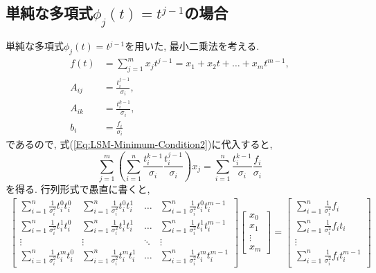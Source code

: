 \subsection{単純な多項式$\phi_{j}(t) = t^{j-1}$の場合}
単純な多項式$\phi_{j}(t) = t^{j-1}$を用いた, 最小二乗法を考える. 
\begin{align}
    f(t) &=
    \sum_{j=1}^{m} x_{j} t^{j-1} =
    x_{1} + x_{2} t + \ldots + x_{m}t^{m-1},
    \\
    A_{ij} &=
    \frac{t_{i}^{j-1}}{\sigma_{i}},
    \\
    A_{ik} &=
    \frac{t_{i}^{k-1}}{\sigma_{i}},
    \\
    b_{i} &=
    \frac{f_{i}}{\sigma_{i}}
\end{align}
であるので, 式(\ref{Eq:LSM-Minimum-Condition2})に代入すると, 
\begin{equation}
    \sum_{j=1}^{m}
    \left(
        \sum_{i=1}^{n}
        \frac{t_{i}^{k-1}}{\sigma_{i}}
        \frac{t_{i}^{j-1}}{\sigma_{i}}
    \right) x_{j}
    =
    \sum_{i=1}^{n}
    \frac{t_{i}^{k-1}}{\sigma_{i}}
    \frac{f_{i}}{\sigma_{i}}
\end{equation}
を得る. 行列形式で愚直に書くと, 
\begin{align}
    \begin{bmatrix}
        \sum_{i=1}^{n} \frac{1}{\sigma_{i}^{2}} t_{i}^{0} t_{i}^{0} &
        \sum_{i=1}^{n} \frac{1}{\sigma_{i}^{2}} t_{i}^{0} t_{i}^{1} &
        \ldots &
        \sum_{i=1}^{n} \frac{1}{\sigma_{i}^{2}} t_{i}^{0} t_{i}^{m-1}
        \\
        \sum_{i=1}^{n} \frac{1}{\sigma_{i}^{2}} t_{i}^{1} t_{i}^{0} &
        \sum_{i=1}^{n} \frac{1}{\sigma_{i}^{2}} t_{i}^{1} t_{i}^{1} &
        \ldots &
        \sum_{i=1}^{n} \frac{1}{\sigma_{i}^{2}} t_{i}^{1} t_{i}^{m-1}
        \\
        \vdots & \vdots & \ddots & \vdots
        \\
        \sum_{i=1}^{n} \frac{1}{\sigma_{i}^{2}} t_{i}^{m} t_{i}^{0} &
        \sum_{i=1}^{n} \frac{1}{\sigma_{i}^{2}} t_{i}^{m} t_{i}^{1} &
        \ldots &
        \sum_{i=1}^{n} \frac{1}{\sigma_{i}^{2}} t_{i}^{m} t_{i}^{m-1}
    \end{bmatrix}
    \begin{bmatrix}
        x_{0}  \\
        x_{1}  \\
        \vdots \\
        x_{m}
    \end{bmatrix}
    =
    \begin{bmatrix}
        \sum_{i=1}^{n} \frac{1}{\sigma_{i}^{2}} f_{i} \\
        \sum_{i=1}^{n} \frac{1}{\sigma_{i}^{2}} f_{i} t_{i} \\
        \vdots \\
        \sum_{i=1}^{n} \frac{1}{\sigma_{i}^{2}} f_{i} t_{i}^{m-1}
    \end{bmatrix}
\end{align}
